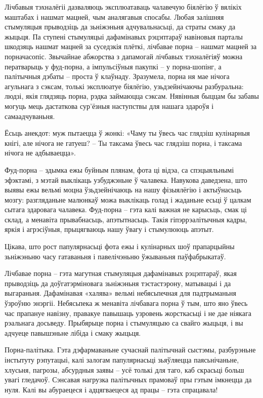 Лічбавыя тэхналёгіі дазваляюць эксплюатаваць чалавечую біялёгію ў вялікіх маштабах і нашмат мацней, чым аналягавыя спосабы. Любая залішняя стымуляцыя прыводзіць да зьніжэньня адчувальнасьці, да страты смаку да жыцьця. Па ступені стымуляцыі дафамінавых рэцэптараў навіновыя парталы шкодзяць нашмат мацней за суседзкія плёткі, лічбавае порна – нашмат мацней за порначасопіс. Звычайнае абжорства з дапамогай лічбавых тэхналёгіяў можна ператварыць у фуд-порна, а імпульсіўныя пакупкі – у порна-шопінг, а палітычныя дэбаты – проста ў клаўнаду. Зразумела, порна ня мае нічога агульнага з сэксам, толькі эксплюатуе біялёгію, узьдзейнічаючы разбуральна: людзі, якія глядзяць порна, рэдка займаюцца сэксам. Нявінныя быццам бы забавы могуць мець дастаткова сур'ёзныя наступствы для нашага здароўя і самаадчуваньня.

Ёсьць анекдот: муж пытаецца ў жонкі: «Чаму ты ўвесь час глядзіш кулінарныя кнігі, але нічога не гатуеш? – Ты таксама ўвесь час глядзіш порна, і таксама нічога не адбываецца».

Фуд-порна – здымка ежы буйным плянам, фота ці відэа, са спэцыяльнымі эфэктамі, з мэтай выклікаць узбуджэньне ў чалавека. Навукова даведзена, што выявы ежы вельмі моцна ўзьдзейнічаюць на нашу фізыялёгію і актыўнасьць мозгу: разгляданьне малюнкаў можа выклікаць голад і жаданьне есьці ў цалкам сытага здаровага чалавека. Фуд-порна – гэта калі важная не карысьць, смак ці склад, а менавіта прывабнасьць, апэтытнасьць. Такія гіпэррэалітычныя кадры, яркія і агрэсіўныя, прыцягваюць нашу ўвагу і стымулююць апэтыт.

Цікава, што рост папулярнасьці фота ежы і кулінарных шоў прапарцыйны зьніжэньню часу гатаваньня і павелічэньню ўжываньня паўфабрыкатаў.

Лічбавае порна – гэта магутная стымуляцыя дафамінавых рэцэптараў, якая прыводзіць да доўгатэрміновага зьніжэньня тэстастэрону, матывацыі і да выгараньня. Дафамінавая «халява» вельмі небясьпечная для падтрыманьня ўзроўню энэргіі. Небясьпека ж менавіта лічбавага порна ў тым, што яно ўвесь час прапануе навізну, правакуе павышаць узровень жорсткасьці і не дае ніякага рэальнага досьведу. Прыбярыце порна і стымуляцыю са свайго жыцьця, і вы адчуеце павышэньне лібіда і смаку жыцьця.

Порна-палітыка. Гэта дэфармаваньне сучаснай палітычнай сыстэмы, разбурэньне інстытуту рэпутацыі, калі залогам папулярнасьці зьяўляецца паясьнічаньне, хлусьня, пагрозы, абсурдныя заявы – усё толькі для таго, каб скрасьці больш увагі гледачоў. Сэнсавая нагрузка палітычных прамоваў пры гэтым імкнецца да нуля. Калі вы абураецеся і адцягваецеся ад працы – гэта спрацавала!

